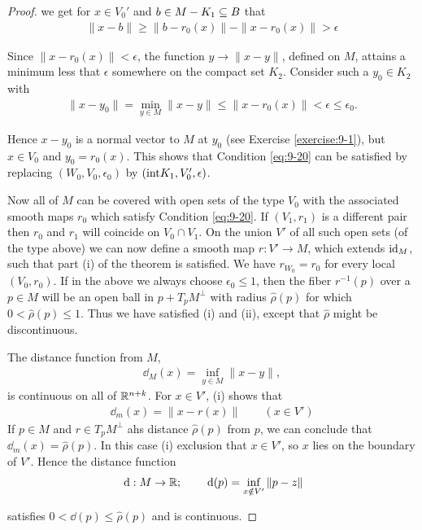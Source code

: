 \begin{proof}
we get for $x\in V_0'$ and $b\in M-K_1\subseteq B$ that 
\begin{align*}
  \|x-b\|\ge \|b-r_0(x)\| - \|x-r_0(x)\| > \epsilon
\end{align*}

Since $\|x-r_0(x)\|<\epsilon$, the function $y\to\|x-y\|$, defined on $M$, attains a minimum less that 
$\epsilon$ somewhere on the compact set $K_2$. Consider such a $y_0\in K_2$ with 
\begin{align*}
  \|x-y_0\| = \min_{y\in M}\|x-y\| \le \|x-r_0(x)\| < \epsilon \le \epsilon_0.
\end{align*}

Hence $x-y_0$ is a normal vector to $M$ at $y_0$ (see Exercise \ref{exercise:9-1}), but $x\in V_0$
and $y_0=r_0(x)$. This shows that Condition \ref{eq:9-20} can be satisfied by replacing $(W_0, V_0, \epsilon_0)$
by $(\mathrm{int}K_1, V_0', \epsilon)$.

Now all of $M$ can be covered with open sets of the type $V_0$ with the associated
smooth maps $r_0$ which satisfy Condition \eqref{eq:9-20}. If $(V_1, r_1)$ is a different 
pair then $r_0$ and $r_1$ will coincide on $V_0\cap V_1$. On the union $V'$ of all such open 
sets (of the type above) we can now define a smooth map $r:V'\to M$, which extends $\operatorname{id}_M$, such
that part (i) of the theorem is satisfied. We have $r_{W_0} = r_0$ for every local $(V_0, r_0)$.
If in the above we always choose $\epsilon_0\le 1$, then the fiber $r^{-1}(p)$ over a $p\in M$ will
be an open ball in $p+T_pM^\perp$ with radius $\hat{\rho}(p)$ for which $0 < \hat{\rho}(p)\le 1$. Thus
we have satisfied (i) and (ii), except that $\hat{\rho}$ might be discontinuous.

The distance function from $M$,
\begin{align*}
  \dd_M(x) = \inf_{y\in M}\|x-y\|,
\end{align*}
is continuous on all of $\mathbb{R}^{n+k}$. For $x\in V'$, (i) shows that 
\begin{align*}
  \dd_m(x) = \|x-r(x)\|\qquad (x\in V')
\end{align*}
If $p\in M$ and $r\in T_pM^\perp$ ahs distance $\hat{\rho}(p)$ from $p$, we can conclude that 
$\dd_m(x) = \hat{\rho}(p)$. In this case (i) exclusion that $x\in V'$, so $x$ lies on the boundary 
of $V'$. Hence the distance function 
\begin{align*}
  \dd:M\to \RR;\qquad \dd(p) = \inf_{x\notin V'}\|p-z\|
\end{align*}

satisfies $0<\dd(p)\le \hat{\rho}(p)$ and is continuous.


\end{proof}
